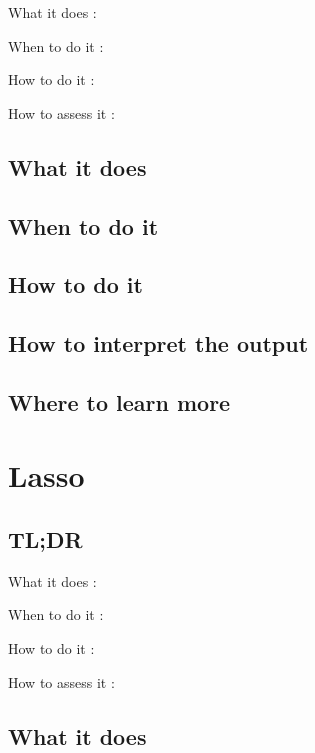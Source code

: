 \documentclass[
]{book}
\begin{document}
What it does
:

When to do it
:

How to do it
:

How to assess it
:

\hypertarget{what-it-does-13}{%
\section{What it does}\label{what-it-does-13}}

\hypertarget{when-to-do-it-13}{%
\section{When to do it}\label{when-to-do-it-13}}

\hypertarget{how-to-do-it-13}{%
\section{How to do it}\label{how-to-do-it-13}}

\hypertarget{how-to-interpret-the-output-13}{%
\section{How to interpret the output}\label{how-to-interpret-the-output-13}}

\hypertarget{where-to-learn-more-13}{%
\section{Where to learn more}\label{where-to-learn-more-13}}

\hypertarget{lasso}{%
\chapter{Lasso}\label{lasso}}

\hypertarget{tldr-14}{%
\section{TL;DR}\label{tldr-14}}

What it does
:

When to do it
:

How to do it
:

How to assess it
:

\hypertarget{what-it-does-14}{%
\section{What it does}\label{what-it-does-14}}
\end{document}
